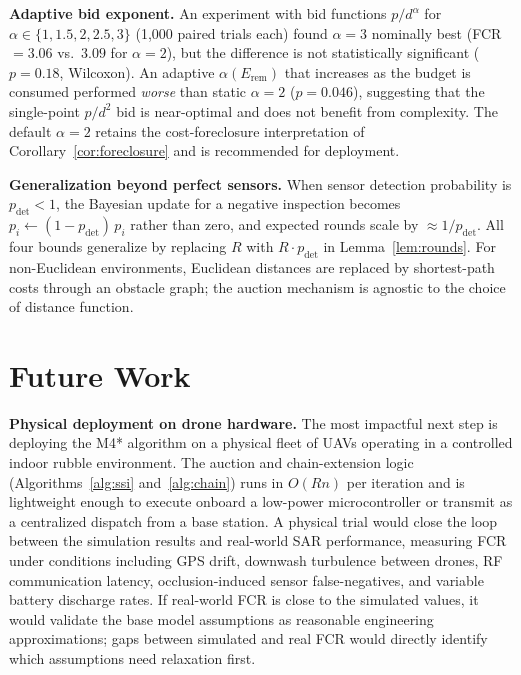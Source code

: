 \documentclass[conference]{IEEEtran}
\begin{document}
\textbf{Adaptive bid exponent.}
An experiment with bid functions $p/d^\alpha$ for $\alpha \in \{1, 1.5, 2,
2.5, 3\}$ (1,000 paired trials each) found $\alpha{=}3$ nominally best
(FCR$=3.06$ vs.\ $3.09$ for $\alpha{=}2$), but the difference is not
statistically significant ($p{=}0.18$, Wilcoxon).
An adaptive $\alpha(E_\mathrm{rem})$ that increases as the budget is
consumed performed \emph{worse} than static $\alpha{=}2$ ($p{=}0.046$),
suggesting that the single-point $p/d^2$ bid is near-optimal and does
not benefit from complexity.
The default $\alpha{=}2$ retains the cost-foreclosure interpretation of
Corollary~\ref{cor:foreclosure} and is recommended for deployment.

\textbf{Generalization beyond perfect sensors.}
When sensor detection probability is $p_{\mathrm{det}} < 1$, the Bayesian
update for a negative inspection becomes $p_i \leftarrow (1-p_{\mathrm{det}})\,p_i$
rather than zero, and expected rounds scale by ${\approx}1/p_{\mathrm{det}}$.
All four bounds generalize by replacing $R$ with $R \cdot p_{\mathrm{det}}$
in Lemma~\ref{lem:rounds}.
For non-Euclidean environments, Euclidean distances are replaced by
shortest-path costs through an obstacle graph; the auction mechanism is
agnostic to the choice of distance function.

\section{Future Work}\label{sec:future}

\textbf{Physical deployment on drone hardware.}
The most impactful next step is deploying the M4* algorithm on a physical
fleet of UAVs operating in a controlled indoor rubble environment.
The auction and chain-extension logic (Algorithms~\ref{alg:ssi}
and~\ref{alg:chain}) runs in $O(Rn)$ per iteration and is lightweight
enough to execute onboard a low-power microcontroller or transmit as a
centralized dispatch from a base station.
A physical trial would close the loop between the simulation results and
real-world SAR performance, measuring FCR under conditions including GPS
drift, downwash turbulence between drones, RF communication latency,
occlusion-induced sensor false-negatives, and variable battery discharge
rates.
If real-world FCR is close to the simulated values, it would validate the
base model assumptions as reasonable engineering approximations; gaps
between simulated and real FCR would directly identify which assumptions
need relaxation first.
\end{document}
